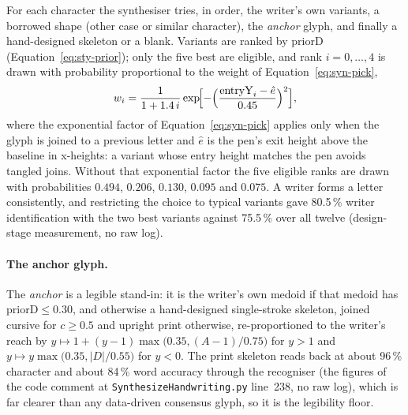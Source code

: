 For each character the synthesiser tries, in order, the writer's own variants, a borrowed shape (other case or similar character), the \emph{anchor} glyph, and finally a hand-designed skeleton or a blank.
Variants are ranked by $\mathrm{priorD}$ (Equation~\ref{eq:sty-prior}); only the five best are eligible, and rank $i=0,\ldots,4$ is drawn with probability proportional to the weight of Equation~\ref{eq:syn-pick},
\begin{equation}
w_i=\frac{1}{1+1.4\,i}\exp\!\Bigl[-\Bigl(\frac{\mathrm{entryY}_i-\hat e}{0.45}\Bigr)^2\Bigr],
\label{eq:syn-pick}
\end{equation}
where the exponential factor of Equation~\ref{eq:syn-pick} applies only when the glyph is joined to a previous letter and $\hat e$ is the pen's exit height above the baseline in x-heights: a variant whose entry height matches the pen avoids tangled joins.
Without that exponential factor the five eligible ranks are drawn with probabilities $0.494$, $0.206$, $0.130$, $0.095$ and $0.075$.
A writer forms a letter consistently, and restricting the choice to typical variants gave 80.5\,\% writer identification with the two best variants against 75.5\,\% over all twelve (design-stage measurement, no raw log).

\paragraph{The anchor glyph.}
The \emph{anchor} is a legible stand-in: it is the writer's own medoid if that medoid has $\mathrm{priorD}\le0.30$, and otherwise a hand-designed single-stroke skeleton, joined cursive for $c\ge0.5$ and upright print otherwise, re-proportioned to the writer's reach by $y\mapsto1+(y-1)\max\bigl(0.35,(A-1)/0.75\bigr)$ for $y>1$ and $y\mapsto y\max\bigl(0.35,|D|/0.55\bigr)$ for $y<0$.
The print skeleton reads back at about 96\,\% character and about 84\,\% word accuracy through the recogniser (the figures of the code comment at \texttt{SynthesizeHandwriting.py} line~238, no raw log), which is far clearer than any data-driven consensus glyph, so it is the legibility floor.

